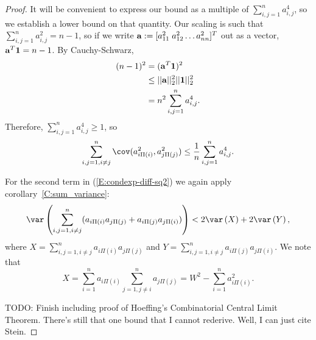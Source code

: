 \begin{proof}
  It will be convenient to express our bound as a multiple of $\sum_{i,j=1}^n a_{i,j}^4$, so we
  establish a lower bound on that quantity.  Our scaling is such that $\sum_{i,j=1}^n a_{i,j}^2 =
  n-1$, so if we write ${\bf a} := [a_{11}^2 \; a_{12}^2 \ldots a_{nn}^2]^T$ out as a vector,
  ${\bf a}^T{\bf 1} = n-1$.  By Cauchy-Schwarz,
  \begin{align*}
    (n - 1)^2 &= ({\bf a}^T{\bf 1})^2 \\
    &\leq ||{\bf a}||_2^2 ||{\bf 1}||_2^2 \\
    &= n^2 \sum_{i,j=1}^n a_{i,j}^4.
  \end{align*}
  Therefore, $\sum_{i,j=1}^n a_{i,j}^4 \geq 1$, so
  \begin{equation}
    \sum_{i,j=1, i\neq j}^n \cov(a_{i \Pi(i)}^2, a_{j \Pi(j)}^2) \leq \frac{1}{n} \sum_{i,j=1}^n a_{i,j}^4.
  \end{equation}

  For the second term in (\ref{E:condexp-diff-sq2}) we again apply corollary~\ref{C:sum_variance}:
  \begin{equation*}
    \var \left ( \sum_{i,j=1, i\neq j}^n (a_{i\Pi(i)}a_{j\Pi(j)} + a_{i\Pi(j)}a_{j\Pi(i)}) \right )
    < 2 \var \left ( X \right ) +
    2 \var \left ( Y \right ),
  \end{equation*}
  where $X = \sum_{i,j=1, i\neq j}^n a_{i\Pi(i)}a_{j\Pi(j)}$ and $Y = \sum_{i,j=1, i\neq j}^n
  a_{i\Pi(j)}a_{j\Pi(i)}$.
  We note that
  \begin{equation}
    X = \sum_{i=1}^n a_{i\Pi(i)} \sum_{j=1, j\neq i}^n a_{j\Pi(j)} = W^2 - \sum_{i=1}^n a_{i\Pi(i)}^2.
  \end{equation}

  TODO: Finish including proof of Hoeffing's Combinatorial Central
  Limit Theorem.  There's still that one bound that I cannot
  rederive.  Well, I can just cite Stein.
\end{proof}

